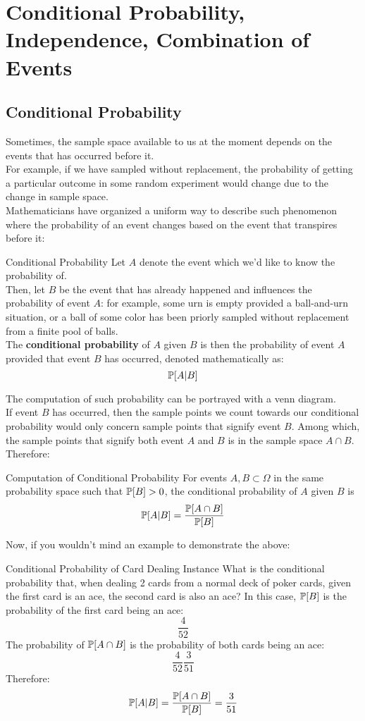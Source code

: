 \chapter{Conditional Probability, Independence, Combination of Events}

\section{Conditional Probability}
Sometimes, the sample space available to us at the moment depends on the events that has occurred before it. \\
For example, if we have sampled without replacement, the probability of getting a particular outcome in some random experiment would change due to the change in sample space. \\
Mathematicians have organized a uniform way to describe such phenomenon where the probability of an event changes based on the event that transpires before it:
\begin{ln-define}{Conditional Probability}{}
    Let $A$ denote the event which we'd like to know the probability of. \\
    Then, let $B$ be the event that has already happened and influences the probability of event $A$: for example, some urn is empty provided a ball-and-urn situation, or a ball of some color has been priorly sampled without replacement from a finite pool of balls. \\
    The \textbf{conditional probability} of $A$ given $B$ is then the probability of event $A$ provided that event $B$ has occurred, denoted mathematically as:
    \[\P[A|B]\]
\end{ln-define}
The computation of such probability can be portrayed with a venn diagram. \\
If event $B$ has occurred, then the sample points we count towards our conditional probability would only concern sample points that signify event $B$. Among which, the sample points that signify both event $A$ and $B$ is in the sample space $A \cap B$. \\
Therefore:
\begin{ln-define}{Computation of Conditional Probability}{}
    For events $A, B \subset \Omega$ in the same probability space such that $\P[B] > 0$, the conditional probability of $A$ given $B$ is
    \[\P[A|B] = \frac{\P[A \cap B]}{\P[B]}\]
\end{ln-define}
Now, if you wouldn't mind an example to demonstrate the above:
\begin{ln-quest}{Conditional Probability of Card Dealing Instance}{}
    What is the conditional probability that, when dealing 2 cards from a normal deck of poker cards, given the first card is an ace, the second card is also an ace?
    \tcblower
    In this case, $\P[B]$ is the probability of the first card being an ace:
    \[\frac{4}{52}\]
    The probability of $\P[A \cap B]$ is the probability of both cards being an ace:
    \[\frac{4}{52} \frac{3}{51}\]
    Therefore:
    \[\P[A|B] = \frac{\P[A \cap B]}{\P[B]} = \frac{3}{51}\]
\end{ln-quest}
